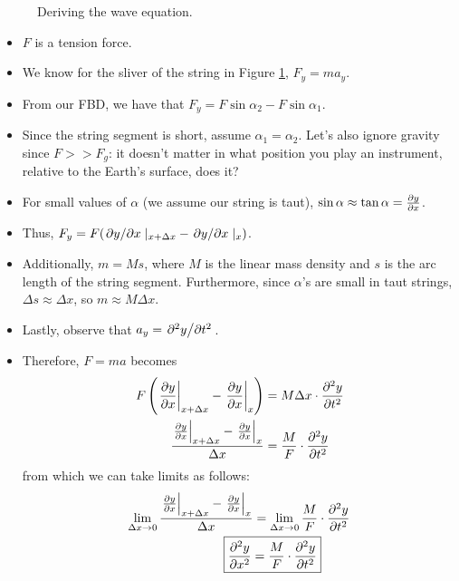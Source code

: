 \documentclass[../notes.tex]{subfiles}
\begin{document}
\begin{itemize}
\begin{figure}[h!]
        \caption{Deriving the wave equation.}
        \label{fig:waveEquationDerivation}
    \end{figure}
    \begin{itemize}
        \item $F$ is a tension force.
        \item We know for the sliver of the string in Figure \ref{fig:waveEquationDerivation}, $F_y=ma_y$.
        \item From our FBD, we have that $F_y=F\sin\alpha_2-F\sin\alpha_1$.
        \item Since the string segment is short, assume $\alpha_1=\alpha_2$. Let's also ignore gravity since $F>>F_g$: it doesn't matter in what position you play an instrument, relative to the Earth's surface, does it?
        \item For small values of $\alpha$ (we assume our string is taut), $\sin\alpha\approx\tan\alpha=\pdv{y}{x}$.
        \item Thus, $F_y=F(\pdv*{y}{x}|_{x+\Delta x}-\pdv*{y}{x}|_{x})$.
        \item Additionally, $m=Ms$, where $M$ is the linear mass density and $s$ is the arc length of the string segment. Furthermore, since $\alpha$'s are small in taut strings, $\Delta s\approx\Delta x$, so $m\approx M\Delta x$.
        \item Lastly, observe that $a_y=\pdv*[2]{y}{t}$.
        \item Therefore, $F=ma$ becomes
        \begin{align*}
            F\left( \eval{\pdv{y}{x}}_{x+\Delta x}-\eval{\pdv{y}{x}}_x \right) &= M\Delta x\cdot\pdv[2]{y}{t}\\
            \frac{\eval{\pdv{y}{x}}_{x+\Delta x}-\eval{\pdv{y}{x}}_x}{\Delta x} &= \frac{M}{F}\cdot\pdv[2]{y}{t}
        \end{align*}
        from which we can take limits as follows:
        \begin{align*}
            \lim_{\Delta x\to 0}\frac{\eval{\pdv{y}{x}}_{x+\Delta x}-\eval{\pdv{y}{x}}_x}{\Delta x} &= \lim_{\Delta x\to 0}\frac{M}{F}\cdot\pdv[2]{y}{t}\\
            \Aboxed{\pdv[2]{y}{x} &= \frac{M}{F}\cdot\pdv[2]{y}{t}}
        \end{align*}
    \end{itemize}

\end{itemize}
\end{document}
